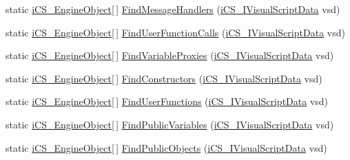 \begin{DoxyCompactItemize}
\item 
static \hyperlink{classi_c_s___engine_object}{i\+C\+S\+\_\+\+Engine\+Object}\mbox{[}$\,$\mbox{]} \hyperlink{classi_c_s___visual_script_data_a1a383c5c2d701ef4843fffc3aa42585e}{Find\+Message\+Handlers} (\hyperlink{interfacei_c_s___i_visual_script_data}{i\+C\+S\+\_\+\+I\+Visual\+Script\+Data} vsd)
\item 
static \hyperlink{classi_c_s___engine_object}{i\+C\+S\+\_\+\+Engine\+Object}\mbox{[}$\,$\mbox{]} \hyperlink{classi_c_s___visual_script_data_a39626c5b1a62648662c30bf0631ff5e3}{Find\+User\+Function\+Calls} (\hyperlink{interfacei_c_s___i_visual_script_data}{i\+C\+S\+\_\+\+I\+Visual\+Script\+Data} vsd)
\item 
static \hyperlink{classi_c_s___engine_object}{i\+C\+S\+\_\+\+Engine\+Object}\mbox{[}$\,$\mbox{]} \hyperlink{classi_c_s___visual_script_data_a7151af3e90f26492392fb639d44eb153}{Find\+Variable\+Proxies} (\hyperlink{interfacei_c_s___i_visual_script_data}{i\+C\+S\+\_\+\+I\+Visual\+Script\+Data} vsd)
\item 
static \hyperlink{classi_c_s___engine_object}{i\+C\+S\+\_\+\+Engine\+Object}\mbox{[}$\,$\mbox{]} \hyperlink{classi_c_s___visual_script_data_a18e21606d09961a1e80b52567ac6651f}{Find\+Constructors} (\hyperlink{interfacei_c_s___i_visual_script_data}{i\+C\+S\+\_\+\+I\+Visual\+Script\+Data} vsd)
\item 
static \hyperlink{classi_c_s___engine_object}{i\+C\+S\+\_\+\+Engine\+Object}\mbox{[}$\,$\mbox{]} \hyperlink{classi_c_s___visual_script_data_a388b48eb3ee9f78e1490e1cb197d7b85}{Find\+User\+Functions} (\hyperlink{interfacei_c_s___i_visual_script_data}{i\+C\+S\+\_\+\+I\+Visual\+Script\+Data} vsd)
\item 
static \hyperlink{classi_c_s___engine_object}{i\+C\+S\+\_\+\+Engine\+Object}\mbox{[}$\,$\mbox{]} \hyperlink{classi_c_s___visual_script_data_af2e09fcfbe00e6001c2f28c7fe294259}{Find\+Public\+Variables} (\hyperlink{interfacei_c_s___i_visual_script_data}{i\+C\+S\+\_\+\+I\+Visual\+Script\+Data} vsd)
\item 
static \hyperlink{classi_c_s___engine_object}{i\+C\+S\+\_\+\+Engine\+Object}\mbox{[}$\,$\mbox{]} \hyperlink{classi_c_s___visual_script_data_ae86c78e09cc8c9dd29d82db9231ae0d4}{Find\+Public\+Objects} (\hyperlink{interfacei_c_s___i_visual_script_data}{i\+C\+S\+\_\+\+I\+Visual\+Script\+Data} vsd)
\end{DoxyCompactItemize}
